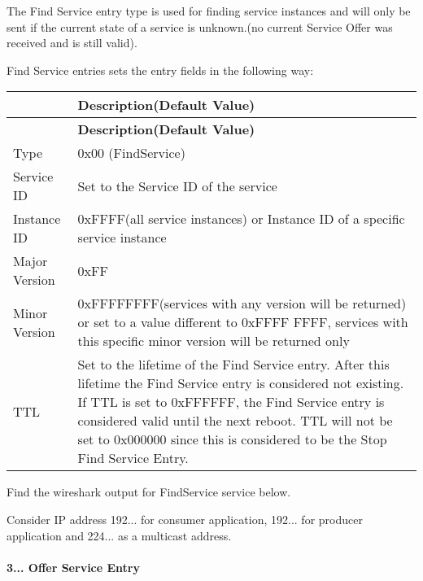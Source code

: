 \begin{DoxyItemize}
\item The Find Service entry type is used for finding service instances and will only be sent if the current state of a service is unknown.(no current Service Offer was received and is still valid).
\item Find Service entries sets the entry fields in the following way\+: \tabulinesep=1mm
\begin{longtabu} spread 0pt [c]{*2{|X[-1]}|}
\hline
{}&{\bf Description(\+Default Value)  }\\
\endfirsthead
\hline
\endfoot
\hline
{}&{\bf Description(\+Default Value)  }\\
\endhead
Type &0x00 (Find\+Service) \\
Service ID &Set to the Service ID of the service \\
Instance ID &0x\+F\+F\+FF(all service instances) or Instance ID of a specific service instance \\
Major Version &0x\+FF \\
Minor Version &0x\+F\+F\+F\+F\+F\+F\+FF(services with any version will be returned) or set to a value different to 0x\+F\+F\+FF F\+F\+FF, services with this specific minor version will be returned only \\
T\+TL &Set to the lifetime of the Find Service entry. After this lifetime the Find Service entry is considered not existing. If T\+TL is set to 0x\+F\+F\+F\+F\+FF, the Find Service entry is considered valid until the next reboot. T\+TL will not be set to 0x000000 since this is considered to be the Stop Find Service Entry. \\
\end{longtabu}

\item Find the wireshark output for Find\+Service service below.
\item Consider IP address 192... for consumer application, 192... for producer application and 224... as a multicast address.
\end{DoxyItemize}

 \paragraph*{3... Offer Service Entry}


